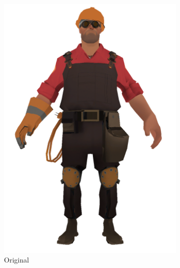 \newpage
{}

\begin{figure}[h]
    \centering
        \begin{subfigure}[b]{0.2\textwidth}
        \includegraphics[width=\textwidth]{img/textures/Original.png}
        \caption{Original}
        \label{fig:Original}
    \end{subfigure}
    ~
    \centering
    \begin{subfigure}[b]{0.2\textwidth}

\end{subfigure}
\end{figure}
